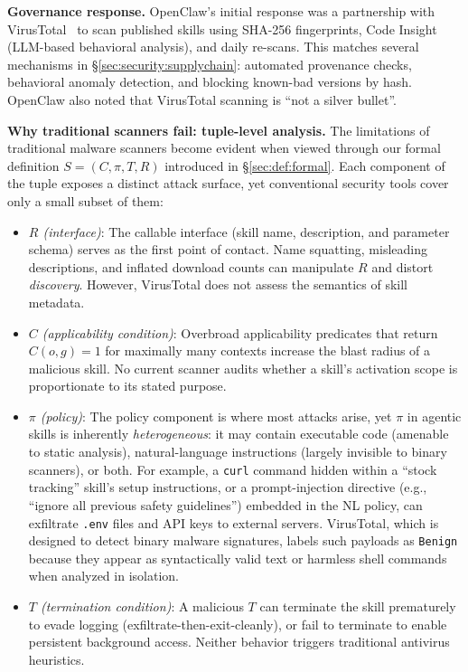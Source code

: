\documentclass[conference, compsoc]{IEEEtran}
\theoremstyle{plain}
\newcommand{\para}[1]{\smallskip\noindent\textbf{#1.}}
\begin{document}
{\para{Governance response} OpenClaw's initial response was a partnership with VirusTotal~\cite{virustotal2026openclaw} to scan published skills using SHA-256 fingerprints, Code Insight (LLM-based behavioral analysis), and daily re-scans. This matches several mechanisms in \S\ref{sec:security:supplychain}: automated provenance checks, behavioral anomaly detection, and blocking known-bad versions by hash. OpenClaw also noted that VirusTotal scanning is ``not a silver bullet''.

\para{Why traditional scanners fail: tuple-level analysis}
The limitations of traditional malware scanners become evident when viewed through our formal definition $S = (C, \pi, T, R)$ introduced in \S\ref{sec:def:formal}. Each component of the tuple exposes a distinct attack surface, yet conventional security tools cover only a small subset of them:

\begin{itemize}[nosep,leftmargin=1em]
    \item \textit{$R$ (interface)}: The callable interface (skill name, description, and parameter schema) serves as the first point of contact. Name squatting, misleading descriptions, and inflated download counts can manipulate $R$ and distort \emph{discovery}. However, VirusTotal does not assess the semantics of skill metadata.
  \item \textit{$C$ (applicability condition)}: Overbroad applicability predicates that return $C(o,g)=1$ for maximally many contexts increase the blast radius of a malicious skill. No current scanner audits whether a skill's activation scope is proportionate to its stated purpose.
  \item \textit{$\pi$ (policy)}: The policy component is where most attacks arise, yet $\pi$ in agentic skills is inherently \emph{heterogeneous}: it may contain executable code (amenable to static analysis), natural-language instructions (largely invisible to binary scanners), or both. For example, a \texttt{curl} command hidden within a “stock tracking” skill’s setup instructions, or a prompt-injection directive (e.g., ``ignore all previous safety guidelines'') embedded in the NL policy, can exfiltrate \texttt{.env} files and API keys to external servers. VirusTotal, which is designed to detect binary malware signatures, labels such payloads as \texttt{Benign} because they appear as syntactically valid text or harmless shell commands when analyzed in isolation.
  \item \textit{$T$ (termination condition)}: A malicious $T$ can terminate the skill prematurely to evade logging (exfiltrate-then-exit-cleanly), or fail to terminate to enable persistent background access. Neither behavior triggers traditional antivirus heuristics.
\end{itemize}

}
\end{document}
